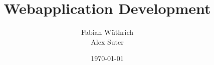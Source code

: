 \titlehead{Hochschule Luzern \\ 
	Technik \& Architektur}
\subject{Zusammenfassung}
\title{Webapplication Development}
\subtitle{}
\author{Fabian Wüthrich \\ 
	Alex Suter}
\date{\today}

\maketitle